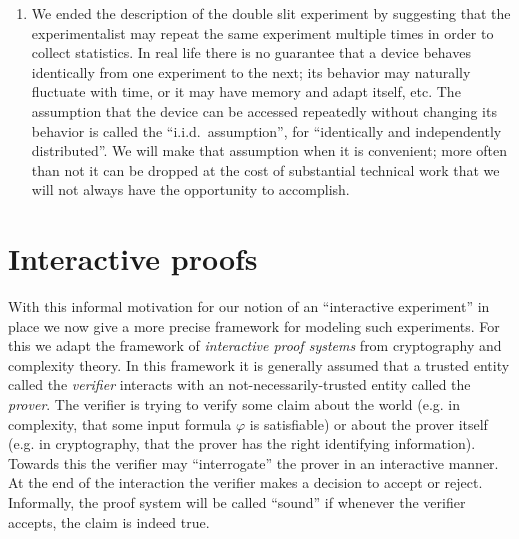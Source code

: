 \begin{enumerate}
\item We ended the description of the double slit experiment by suggesting that the experimentalist may repeat the same experiment multiple times in order to collect statistics. In real life there is no guarantee that a device behaves identically from one experiment to the next; its behavior may naturally fluctuate with time, or it may have memory and adapt itself, etc. The assumption that the device can be accessed repeatedly without changing its behavior is called the ``i.i.d.\ assumption'', for ``identically and independently distributed''. We will make that assumption when it is convenient; more often than not it can be dropped at the cost of substantial technical work that we will not always have the opportunity to accomplish. 
\end{enumerate}


\section{Interactive proofs}

With this informal motivation for our notion of an ``interactive experiment'' in place we now give a more precise framework for modeling such experiments. For this we adapt the framework of \emph{interactive proof systems} from cryptography and complexity theory. In this framework it is generally assumed that a trusted entity called the \emph{verifier} interacts with an not-necessarily-trusted entity called the \emph{prover}. The verifier is trying to verify some claim about the world (e.g. in complexity, that some input formula $\varphi$ is satisfiable) or about the prover itself (e.g. in cryptography, that the prover has the right identifying information). Towards this the verifier may ``interrogate'' the prover in an interactive manner. At the end of the interaction the verifier makes a decision to accept or reject. Informally, the proof system will be called ``sound'' if whenever the verifier accepts, the claim is indeed true. 

